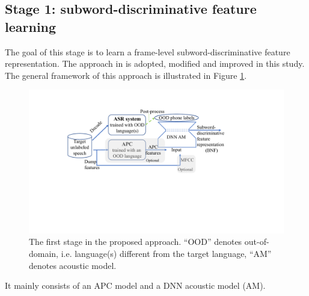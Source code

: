 \documentclass[a4paper]{article}
\begin{document}
\subsection{Stage 1: subword-discriminative feature learning}
\label{subsec:approach_1st}
The goal of this stage is to learn a frame-level subword-discriminative feature representation.
The approach in \cite{feng2020unsupervised} is adopted, modified and improved in this study.
The  general framework of this approach is illustrated in Figure \ref{fig:framework_1st}.
\begin{figure}[!t]
    \centering
    \includegraphics[width =  \linewidth]{LaTeX/USM.pdf}
    \caption{The first stage in the proposed approach. ``OOD'' denotes out-of-domain, i.e. language(s) different from the target language, ``AM'' denotes acoustic model.}
    \label{fig:framework_1st}
\end{figure}
It mainly consists of  an APC model and a  DNN acoustic model (AM). 
\end{document}

